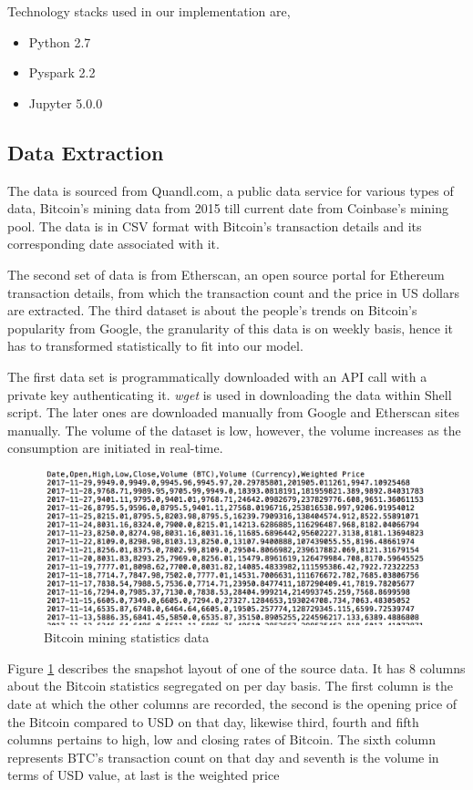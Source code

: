 \documentclass[sigconf]{acmart}
\begin{document}
Technology stacks used in our implementation are, 
\begin{itemize}
\item Python 2.7 
\item Pyspark 2.2
\item Jupyter 5.0.0
\end{itemize}


\subsection{Data Extraction}
The data is sourced from Quandl.com, a public data service for various types of data, Bitcoin's mining data from 2015 till current date from Coinbase's mining pool. The data is in CSV format with Bitcoin's transaction details and its corresponding date associated with it.

The second set of data is from Etherscan, an open source portal for Ethereum transaction details, from which the transaction count and the price in US dollars are extracted.
The third dataset is about the people's trends on Bitcoin's popularity from Google, the granularity of this data is on weekly basis, hence it has to transformed statistically to fit into our model.

The first data set is programmatically downloaded with an API call with a private key authenticating it. {\em wget } is used in downloading the data within Shell script.
The later ones are downloaded manually from Google and Etherscan sites manually. The volume of the dataset is low, however, the volume increases as the consumption are initiated in real-time.

\begin{figure}[!ht]
  \centering\includegraphics[width=\columnwidth]{images/Source1data.png}
  \caption{Bitcoin mining statistics data}
  \label{fig:sourcedata}
\end{figure}


Figure \ref{fig:sourcedata} describes the snapshot layout of one of the source data. It has 8 columns about the Bitcoin statistics segregated on per day basis. The first column is the date at which the other columns are recorded, the second is the opening price of the Bitcoin compared to USD on that day, likewise third, fourth and fifth columns pertains to high, low and closing rates of Bitcoin. The sixth column represents BTC's transaction count on that day and seventh is the volume in terms of USD value, at last is the weighted price 
\end{document}
